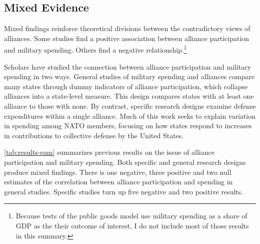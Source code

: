 \documentclass[12pt]{article}
\begin{document}
\subsection{Mixed Evidence} 


Mixed findings reinforce theoretical divisions between the contradictory views of alliances.
Some studies find a positive association between alliance participation and military spending. 
Others find a negative relationship.\footnote{
Because tests of the public goods model use military spending as a share of GDP as the their outcome of interest, I do not include most of those results in this summary.} 


Scholars have studied the connection between alliance participation and military spending in two ways. 
General studies of military spending and alliances compare many states through dummy indicators of alliance participation, which collapse alliances into a state-level measure. 
This design compares states with at least one alliance to those with none.
By contrast, specific research designs examine defense expenditures within a single alliance. 
Much of this work seeks to explain variation in spending among NATO members, focusing on how states respond to increases in contributions to collective defense by the United States.


\autoref{tab:results-sum} summarizes previous results on the issue of alliance participation and military spending. 
Both specific and general research designs produce mixed findings. 
There is one negative, three positive and two null estimates of the correlation between alliance participation and spending in general studies. 
Specific studies turn up five negative and two positive results.  
\end{document}

